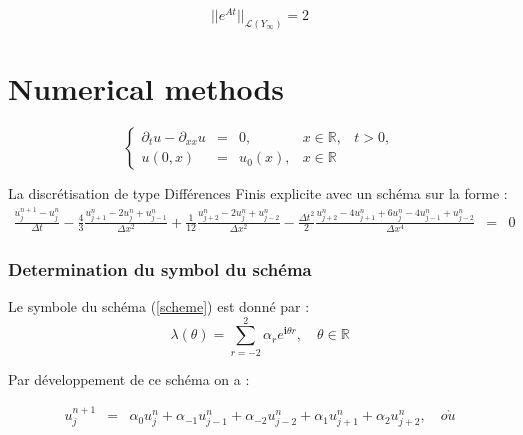 \documentclass[a4paper,11pt]{article}
\begin{document}
\begin{equation*}
    ||e^{At}||_{\mathcal{L}(Y_{\infty})} = 2
\end{equation*}






\setcounter{section}{0}

\part{Numerical methods}

\begin{equation}
    \left\{
    \begin{array}{rclll}
        \partial_{t}u - \partial_{xx}u &=& 0, &x \in \mathbb{R}, & t>0, \\
        u(0, x) &=& u_{0}(x), &x \in \mathbb{R} &
    \end{array}
    \right.
\end{equation}

La discrétisation de type Différences Finis explicite avec un schéma sur la forme :
\begin{equation}
    \begin{array}{rcl} \label{scheme}
        \frac{u^{n+1}_{j} - u^{n}_{j}}{\Delta t}
        -\frac{4}{3} \frac{u^{n}_{j+1} - 2u^{n}_{j} + u^{n}_{j-1}}{\Delta x^{2}}
        +\frac{1}{12} \frac{u^{n}_{j+2} - 2u^{n}_{j} + u^{n}_{j-2}}{\Delta x^{2}}
        -\frac{\Delta t^{2}}{2} \frac{u^{n}_{j+2} - 4u^{n}_{j+1} + 6u^{n}_{j}  - 4u^{n}_{j-1} + u^{n}_{j-2}}{\Delta x^{4}}  &=& 0 
    \end{array}
\end{equation}


\section{Determination du symbol du schéma}

Le symbole du schéma (\ref{scheme}) est donné par :
\begin{equation*}
\lambda(\theta) = \sum \limits_{r=-2}^{2} \alpha_{r} e^{\mathbf{i} \theta r}, \quad \theta \in \mathbb{R}
\end{equation*}

Par développement de ce schéma on a :

\begin{equation*}
    \begin{array}{rcl}
        u^{n+1}_{j} &=& \alpha_{0} u^{n}_{j} + \alpha_{-1} u^{n}_{j-1} + \alpha_{-2} u^{n}_{j-2} + \alpha_{1} u^{n}_{j+1}  + \alpha_{2} u^{n}_{j+2}, \quad o\grave{u}
    \end{array}
\end{equation*}
\end{document}
